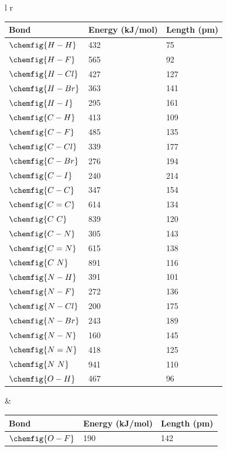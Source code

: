 \onecolumn
\normalsize
\clearpage
\begin{table}[ht]
    \centering
    \begin{tabular}{l r }
        \begin{tabular}{l l l }
            Bond & Energy (kJ/mol) & Length (pm) \\
            \hline
            $\chemfig{H-H}$ & 432 & 75 \\
            $\chemfig{H-F}$ & 565 & 92 \\
            $\chemfig{H-Cl}$ & 427 & 127 \\
            $\chemfig{H-Br}$ & 363 & 141 \\
            $\chemfig{H-I}$ & 295 & 161 \\
            $\chemfig{C-H}$ & 413 & 109 \\
            $\chemfig{C-F}$ & 485 & 135 \\
            $\chemfig{C-Cl}$ & 339 & 177 \\
            $\chemfig{C-Br}$ & 276 & 194 \\
            $\chemfig{C-I}$ & 240 & 214 \\
            $\chemfig{C-C}$ & 347 & 154 \\
            $\chemfig{C=C}$ & 614 & 134 \\
            $\chemfig{C~C}$ & 839 & 120 \\
            $\chemfig{C-N}$ & 305 & 143 \\
            $\chemfig{C=N}$ & 615 & 138 \\
            $\chemfig{C~N}$ & 891 & 116 \\
            $\chemfig{N-H}$ & 391 & 101 \\
            $\chemfig{N-F}$ & 272 & 136 \\
            $\chemfig{N-Cl}$ & 200 & 175 \\
            $\chemfig{N-Br}$ & 243 & 189 \\
            $\chemfig{N-N}$ & 160 & 145 \\
            $\chemfig{N=N}$ & 418 & 125 \\
            $\chemfig{N~N}$ & 941 & 110 \\
            $\chemfig{O-H}$ & 467 & 96 \\
        \end{tabular} &
        \begin{tabular}{l l l }
            Bond & Energy (kJ/mol) & Length (pm) \\
            \hline
            $\chemfig{O-F}$ & 190 & 142 \\

\end{tabular}
\end{tabular}
\end{table}
